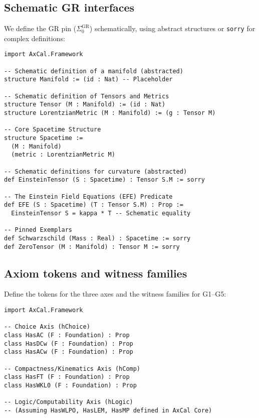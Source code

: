 \documentclass[11pt]{article}
\theoremstyle{definition}
\theoremstyle{remark}
\newcommand{\SigmaZero}{\Sigma_{0}}
\begin{document}
\subsection{Schematic GR interfaces}

We define the GR pin ($\SigmaZero^{\mathrm{GR}}$) schematically, using abstract structures or \texttt{sorry} for complex definitions:

\begin{lstlisting}[caption={GR/Interfaces.lean}]
import AxCal.Framework

-- Schematic definition of a manifold (abstracted)
structure Manifold := (id : Nat) -- Placeholder

-- Schematic definition of Tensors and Metrics
structure Tensor (M : Manifold) := (id : Nat)
structure LorentzianMetric (M : Manifold) := (g : Tensor M)

-- Core Spacetime Structure
structure Spacetime :=
  (M : Manifold)
  (metric : LorentzianMetric M)

-- Schematic definitions for curvature (abstracted)
def EinsteinTensor (S : Spacetime) : Tensor S.M := sorry

-- The Einstein Field Equations (EFE) Predicate
def EFE (S : Spacetime) (T : Tensor S.M) : Prop :=
  EinsteinTensor S = kappa * T -- Schematic equality

-- Pinned Exemplars
def Schwarzschild (Mass : Real) : Spacetime := sorry
def ZeroTensor (M : Manifold) : Tensor M := sorry
\end{lstlisting}

\subsection{Axiom tokens and witness families}

Define the tokens for the three axes and the witness families for G1--G5:

\begin{lstlisting}[caption={Calibration/Tokens.lean}]
import AxCal.Framework

-- Choice Axis (hChoice)
class HasAC (F : Foundation) : Prop
class HasDCw (F : Foundation) : Prop
class HasACw (F : Foundation) : Prop

-- Compactness/Kinematics Axis (hComp)
class HasFT (F : Foundation) : Prop
class HasWKL0 (F : Foundation) : Prop

-- Logic/Computability Axis (hLogic)
-- (Assuming HasWLPO, HasLEM, HasMP defined in AxCal Core)
\end{lstlisting}
\end{document}
